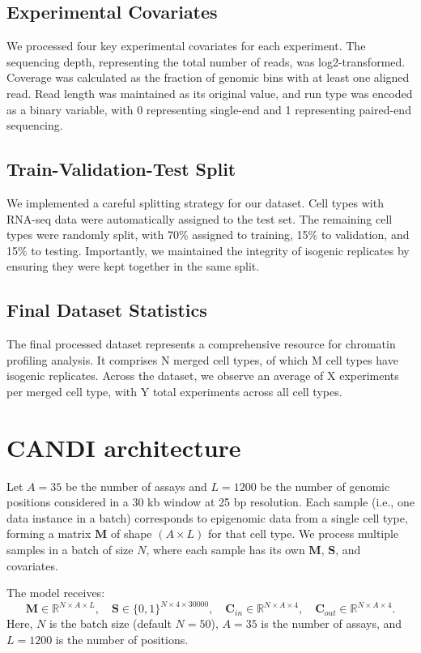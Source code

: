 \documentclass[a4paper, 11pt]{article}
\begin{document}
\subsection{Experimental Covariates}
We processed four key experimental covariates for each experiment. The sequencing depth, representing the total number of reads, was log2-transformed. Coverage was calculated as the fraction of genomic bins with at least one aligned read. Read length was maintained as its original value, and run type was encoded as a binary variable, with 0 representing single-end and 1 representing paired-end sequencing.

\subsection{Train-Validation-Test Split}
We implemented a careful splitting strategy for our dataset. Cell types with RNA-seq data were automatically assigned to the test set. The remaining cell types were randomly split, with 70\% assigned to training, 15\% to validation, and 15\% to testing. Importantly, we maintained the integrity of isogenic replicates by ensuring they were kept together in the same split.

\subsection{Final Dataset Statistics}
The final processed dataset represents a comprehensive resource for chromatin profiling analysis. It comprises N merged cell types, of which M cell types have isogenic replicates. Across the dataset, we observe an average of X experiments per merged cell type, with Y total experiments across all cell types.
\newpage
\section{CANDI architecture}
Let $A=35$ be the number of assays and $L=1200$ be the number of genomic positions considered in a 30 kb window at 25 bp resolution. Each sample (i.e., one data instance in a batch) corresponds to epigenomic data from a single cell type, forming a matrix $\mathbf{M}$ of shape $(A \times L)$ for that cell type. We process multiple samples in a batch of size $N$, where each sample has its own $\mathbf{M}$, $\mathbf{S}$, and covariates.

The model receives:
\[
\mathbf{M} \in \mathbb{R}^{N \times A \times L}, \quad \mathbf{S} \in \{0,1\}^{N \times 4 \times 30000}, \quad \mathbf{C}_{in} \in \mathbb{R}^{N \times A \times 4}, \quad \mathbf{C}_{out} \in \mathbb{R}^{N \times A \times 4}.
\]
Here, $N$ is the batch size (default $N=50$), $A=35$ is the number of assays, and $L=1200$ is the number of positions.
\end{document}
